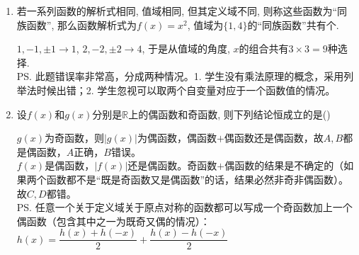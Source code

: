 \begin{enumerate}
\begin{jieda}
    \end{jieda}
    \item 若一系列函数的解析式相同, 值域相同, 但其定义域不同, 则称这些函数为``同族函数'', 
    那么函数解析式为$f(x)=x^2$, 值域为$\{1,4\}$的``同族函数''共有个.
    \begin{jieda}
    $1,-1,\pm1\to 1$, $2,-2,\pm2\to 4$, 于是从值域的角度, $x$的组合共有$3\times3=9$种选择. \\
    \ps 此题错误率非常高，分成两种情况。1. 学生没有乘法原理的概念，采用列举法时候出错；2. 学生忽视可以取两个自变量对应于一个函数值的情况。
    \end{jieda} 
    \item 设$f(x)$和$g(x)$分别是$\mathbb{R}$上的偶函数和奇函数, 则下列结论恒成立的是\dotfill()
    \begin{jieda}
    $g(x)$为奇函数，则$|g(x)|$为偶函数，偶函数$+$偶函数还是偶函数，故$A, B$都是偶函数，$A$正确，$B$错误。\\
    $f(x)$是偶函数，$|f(x)|$还是偶函数。奇函数$+$偶函数的结果是不确定的（如果两个函数都不是“既是奇函数又是偶函数”的话，结果必然非奇非偶函数）。故$C,D$都错。\\
    \ps 任意一个关于定义域关于原点对称的函数都可以写成一个奇函数加上一个偶函数（包含其中之一为既奇又偶的情况）：$h(x) = \dfrac{h(x)+h(-x)}{2} + \dfrac{h(x) - h(-x)}{2}$
    \end{jieda}
    

\end{enumerate}
